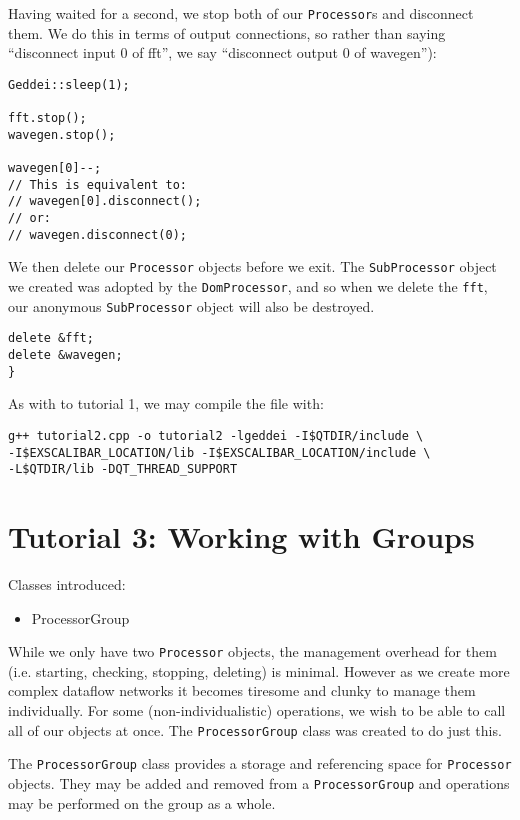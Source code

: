 Having waited for a second, we stop both of our \texttt{Processor}s and disconnect them. We do this in terms of output connections, so rather than saying ``disconnect input 0 of fft'', we say ``disconnect output 0 of wavegen''):

\begin{verbatim}
Geddei::sleep(1);

fft.stop();
wavegen.stop();

wavegen[0]--;
// This is equivalent to:
// wavegen[0].disconnect();
// or:
// wavegen.disconnect(0);
\end{verbatim}

We then delete our \texttt{Processor} objects before we exit. The \texttt{SubProcessor} object we created was adopted by the \texttt{DomProcessor}, and so when we delete the \texttt{fft}, our anonymous \texttt{SubProcessor} object will also be destroyed.

\begin{verbatim}
delete &fft;
delete &wavegen;
}
\end{verbatim}

As with to tutorial 1, we may compile the file with:

\begin{verbatim}
g++ tutorial2.cpp -o tutorial2 -lgeddei -I$QTDIR/include \
-I$EXSCALIBAR_LOCATION/lib -I$EXSCALIBAR_LOCATION/include \
-L$QTDIR/lib -DQT_THREAD_SUPPORT
\end{verbatim}




\section{Tutorial 3: Working with Groups}

Classes introduced:
\begin{itemize}
\item ProcessorGroup
\end{itemize}

While we only have two \texttt{Processor} objects, the management overhead for them (i.e. starting, checking, stopping, deleting) is minimal. However as we create more complex dataflow networks it becomes tiresome and clunky to manage them individually. For some (non-individualistic) operations, we wish to be able to call all of our objects at once. The \texttt{ProcessorGroup} class was created to do just this.

The \texttt{ProcessorGroup} class provides a storage and referencing space for \texttt{Processor} objects. They may be added and removed from a \texttt{ProcessorGroup} and operations may be performed on the group as a whole.


